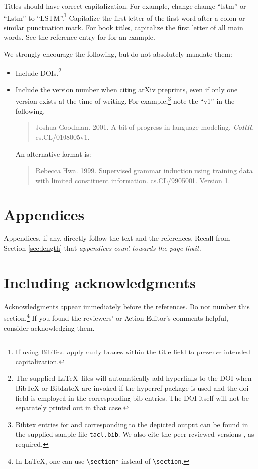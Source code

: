 \documentclass[11pt,a4paper]{article}
\begin{document}
Titles should have correct capitalization.  For example, change change
``lstm'' or ``Lstm'' to ``LSTM''.\footnote{If using BibTex, apply curly braces
within the title field to preserve intended capitalization.}   Capitalize the
first letter of the first word after a colon or similar punctuation mark.  For
book titles, capitalize the first letter of all main words.  See the
reference entry for \citet{Jurafsky+Martin:2009a} for an example.


We strongly encourage the following, but do not absolutely mandate them:
\begin{itemize}
\item Include DOIs.\footnote{The supplied \LaTeX\ files will
automatically add hyperlinks to the DOI when BibTeX or
BibLateX are invoked if the hyperref package is used and
the doi field is employed in the corresponding bib entries.
The DOI itself will not be separately printed out in that case.}
\item Include the version number when citing arXiv preprints, even if only one
version exists at the time of writing.
For example,\footnote{Bibtex entries for \citet{DBLP:journals/corr/cs-CL-0108005} and
\citet{DBLP:journals/corr/cs-CL-9905001} corresponding to the depicted output
can be found in the supplied sample file {\tt tacl.bib}.  We also cite
the peer-reviewed versions \cite{GOODMAN2001403,P99-1010}, as required.}
note the ``v1'' in the following.
\begin{quote}
Joshua Goodman.  2001.  A bit of progress in language modeling. {\it CoRR},
cs.CL/0108005v1.
\end{quote}
An alternative format is:
\begin{quote}
Rebecca Hwa. 1999. Supervised grammar induction using training data with limited constituent
information. {cs.CL/9905001}. Version 1.
\end{quote}
\end{itemize}

\section{Appendices} Appendices, if any, directly follow the text and the
references.  Recall from Section \ref{sec:length} that {\em appendices count
towards the page
limit.}


\iftaclfinal

\section{Including acknowledgments}
Acknowledgments appear immediately before the references.  Do not number this
section.\footnote{In \LaTeX, one can use {\tt {\textbackslash}section*} instead
of {\tt {\textbackslash}section}.} If you found the reviewers' or Action
Editor's comments helpful, consider acknowledging them.
\else
\fi
\end{document}
